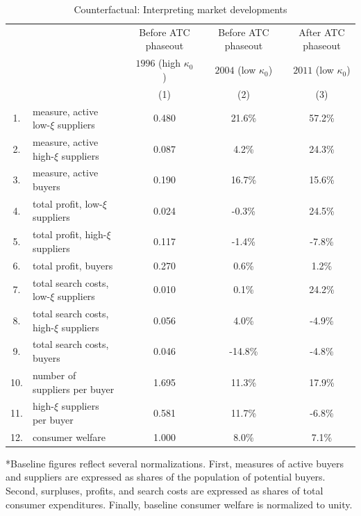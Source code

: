 \begin{table}[tbp]
\caption{Counterfactual: Interpreting market developments}
\label{tab:experiments}\centering
\resizebox{\textwidth}{!} {

\begin{tabular}{ccccccccc}
\hline\hline
&  &  &  & Before ATC phaseout &  & Before ATC phaseout &  & After ATC phaseout \\
&  &  &  & $1996$ (high $\kappa_0$) &  & $2004$ (low $\kappa_0$) &  & $2011$ (low $\kappa_0$) \\
\hline
&  &  &  & (1) &  & (2) &  & (3) \\
\hline
1. & \multicolumn{2}{l}{measure, active low-$\xi$ suppliers} &  & 0.480 &  & 21.6\% &  & 57.2\% \\
2. & \multicolumn{2}{l}{measure, active high-$\xi$ suppliers} &  & 0.087 &  & 4.2\% &  & 24.3\% \\
3. & \multicolumn{2}{l}{measure, active buyers} &  & 0.190 &  & 16.7\% &  & 15.6\% \\
4. & \multicolumn{2}{l}{total profit, low-$\xi$ suppliers} &  & 0.024 &  & -0.3\% &  & 24.5\% \\
5. & \multicolumn{2}{l}{total profit, high-$\xi$ suppliers} &  & 0.117 &  & -1.4\% &  & -7.8\% \\
6. & \multicolumn{2}{l}{total profit, buyers} &  & 0.270 &  & 0.6\% &  & 1.2\% \\
7. & \multicolumn{2}{l}{total search costs, low-$\xi$ suppliers} &  & 0.010 &  & 0.1\% &  & 24.2\% \\
8. & \multicolumn{2}{l}{total search costs, high-$\xi$ suppliers} &  & 0.056 &  & 4.0\% &  & -4.9\% \\
9. & \multicolumn{2}{l}{total search costs, buyers} &  & 0.046 &  & -14.8\% &  & -4.8\% \\
10. & \multicolumn{2}{l}{number of suppliers per buyer} &  & 1.695 &  & 11.3\% &  & 17.9\% \\
11. & \multicolumn{2}{l}{high-$\xi$ suppliers per buyer} &  & 0.581 &  & 11.7\% &  & -6.8\% \\
12. & \multicolumn{2}{l}{consumer welfare} &  & 1.000 &  & 8.0\% &  & 7.1\% \\
\hline
\end{tabular}
}
\begin{tablenotes}\footnotesize
\medskip
\item [a] *Baseline figures reflect several normalizations. First, measures of active buyers and suppliers are expressed as shares of the population of potential buyers. Second, surpluses, profits, and search costs are expressed as shares of total consumer expenditures. Finally, baseline consumer welfare is normalized to unity.
\end{tablenotes}
\end{table}
